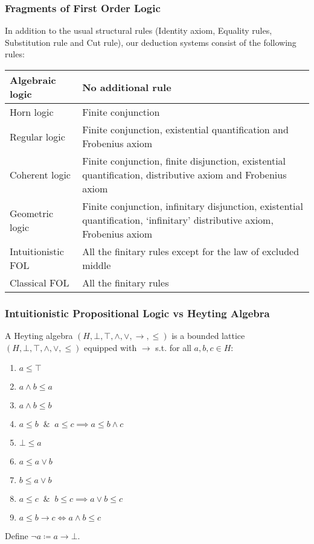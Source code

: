 \documentclass[UTF8,aspectratio=43,11pt,colorlinks,compress,openany]{beamer}%
\begin{document}
\begin{frame}\frametitle{Fragments of First Order Logic}
In addition to the usual structural rules (Identity axiom, Equality rules, Substitution rule and Cut rule), our deduction systems consist of the following rules:\\
\centering
\begin{tabu}{|p{.23\textwidth}|p{.67\textwidth}|}
\hline
	Algebraic logic &No additional rule\\
\hline
Horn logic &Finite conjunction\\
\hline
Regular logic &Finite conjunction, existential quantification and Frobenius axiom\\
\hline
	Coherent logic &Finite conjunction, finite disjunction, existential quantification, distributive axiom and Frobenius axiom\\
\hline
	Geometric logic &Finite conjunction, infinitary disjunction, existential quantification, `infinitary' distributive axiom, Frobenius axiom\\
\hline
Intuitionistic FOL &All the finitary rules except for the law of excluded middle\\
\hline
	Classical FOL &All the finitary rules\\
\hline
\end{tabu}
\end{frame}

\begin{frame}\frametitle{Intuitionistic Propositional Logic vs Heyting Algebra}
A Heyting algebra $(H,\bot,\top,\wedge,\vee,\to,\leq)$ is a bounded lattice $(H,\bot,\top,\wedge,\vee,\leq)$ equipped with $\to$ s.t. for all $a,b,c\in H$:
\begin{enumerate}
	\item $a\leq \top$
	\item $a\wedge b\leq a$
	\item $a\wedge b\leq b$
	\item $a\leq b\;\;\&\;\;a\leq c\implies a\leq b\wedge c$
	\item $\bot\leq a$
	\item $a\leq a\vee b$
	\item $b\leq a\vee b$
	\item $a\leq c\;\;\&\;\;b\leq c\implies a\vee b\leq c$
	\item $a\leq b\to c\iff a\wedge b\leq c$
\end{enumerate}
Define $\neg a\coloneqq a\to\bot$.
\end{frame}
\end{document}
